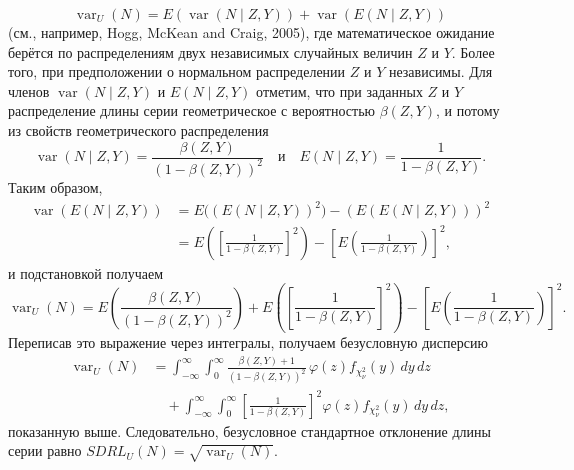 \[
	\operatorname{var}_U(N) = E(\operatorname{var}(N \mid Z, Y)) + \operatorname{var}(E(N \mid Z, Y))
\]
(см., например, Hogg, McKean and Craig, 2005), где математическое ожидание берётся по распределениям двух независимых случайных величин \(Z\) и \(Y\). Более того, при предположении о нормальном распределении \(Z\) и \(Y\) независимы. Для членов \(\operatorname{var}(N \mid Z, Y)\) и \(E(N \mid Z, Y)\) отметим, что при заданных \(Z\) и \(Y\) распределение длины серии геометрическое с вероятностью \(\beta(Z, Y)\), и потому из свойств геометрического распределения
\[
	\operatorname{var}(N \mid Z, Y) = \frac{\beta(Z, Y)}{(1 - \beta(Z, Y))^2}
	\quad\text{и}\quad
	E(N \mid Z, Y) = \frac{1}{1 - \beta(Z, Y)}.
\]
Таким образом,
\[
\begin{aligned}
	\operatorname{var}(E(N \mid Z, Y))
	&= E\big((E(N \mid Z, Y))^2\big) - (E(E(N \mid Z, Y)))^2 \\
	&= E\left(\left[\frac{1}{1 - \beta(Z, Y)}\right]^2\right)
	   - \left[E\left(\frac{1}{1 - \beta(Z, Y)}\right)\right]^2,
\end{aligned}
\]
и подстановкой получаем
\[
	\operatorname{var}_U(N) = E\left(\frac{\beta(Z, Y)}{(1 - \beta(Z, Y))^2}\right)
	+ E\left(\left[\frac{1}{1 - \beta(Z, Y)}\right]^2\right)
	- \left[E\left(\frac{1}{1 - \beta(Z, Y)}\right)\right]^2.
\]
Переписав это выражение через интегралы, получаем безусловную дисперсию
\[
\begin{aligned}
	\operatorname{var}_U(N)
	&= \int_{-\infty}^{\infty}\int_0^{\infty} \frac{\beta(Z, Y) + 1}{(1 - \beta(Z, Y))^2}\,
	\varphi(z) f_{\chi^2_\nu}(y)\,dy\,dz \\
	&\quad + \int_{-\infty}^{\infty}\int_0^{\infty}\left[\frac{1}{1 - \beta(Z, Y)}\right]^2
	\varphi(z) f_{\chi^2_\nu}(y)\,dy\,dz,
\end{aligned}
\]
показанную выше. Следовательно, безусловное стандартное отклонение длины серии равно \(SDRL_U(N) = \sqrt{\operatorname{var}_U(N)}\).


